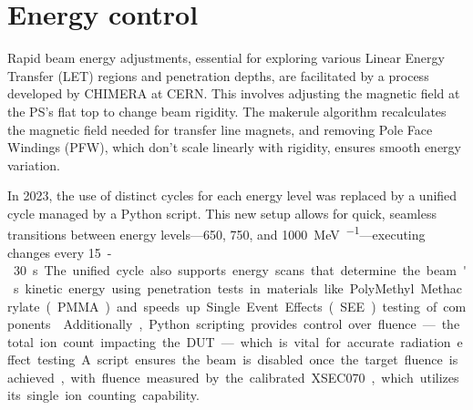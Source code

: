 \documentclass[a4paper,
               biblatex,     %
               ]{jacow}
\begin{document}













\section{Energy control}

Rapid beam energy adjustments, essential for exploring various Linear Energy Transfer (LET) regions and penetration depths, are facilitated by a process developed by CHIMERA at CERN. This involves adjusting the magnetic field at the PS's flat top to change beam rigidity. The makerule algorithm recalculates the magnetic field needed for transfer line magnets, and removing Pole Face Windings (PFW), which don't scale linearly with rigidity, ensures smooth energy variation.

In 2023, the use of distinct cycles for each energy level was replaced by a unified cycle managed by a Python script. This new setup allows for quick, seamless transitions between energy levels—\SI{650}{}, \SI{750}{}, and \SI{1000}{\mega\electronvolt\per\nucleon}—executing changes every \SI{15}-\SI{30}{\second}. The unified cycle also supports energy scans that determine the beam's kinetic energy using penetration tests in materials like PolyMethyl Methacrylate (PMMA) and speeds up Single Event Effects (SEE) testing of components. \cite{noauthor_hearts_nodate}

Additionally, Python scripting provides control over fluence—the total ion count impacting the DUT—which is vital for accurate radiation effect testing. A script ensures the beam is disabled once the target fluence is achieved, with fluence measured by the calibrated XSEC070, which utilizes its single ion counting capability.
\end{document}
